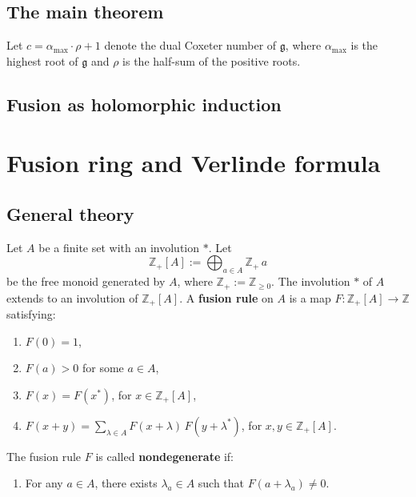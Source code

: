 \documentclass[12pt]{article}
\begin{document}
\subsection{The main theorem}
Let $c = \alpha_{\max} \cdot \rho + 1$ denote the dual Coxeter number of $\mathfrak{g}$, where $\alpha_{\max}$ is the highest root of $\mathfrak{g}$ and $\rho$ is the half-sum of the positive roots. 
\subsection{Fusion as holomorphic induction}

\section{Fusion ring and Verlinde formula}

\subsection{General theory}
\begin{definition}
Let $A$ be a finite set with an involution $*$. Let
\[
\mathbb{Z}_+[A] := \bigoplus_{a\in A} \mathbb{Z}_+\, a
\]
be the free monoid generated by $A$, where $\mathbb{Z}_+ := \mathbb{Z}_{\ge 0}$. The involution $*$ of $A$ extends to an involution of $\mathbb{Z}_+[A]$. A \textbf{fusion rule} on $A$ is a map $F:\mathbb{Z}_+[A]\to \mathbb{Z}$ satisfying:
\begin{enumerate}[(f1)]
\item $F(0)=1$,
\item $F(a)>0$ for some $a\in A$,
\item $F(x)=F(x^*)$, for $x\in \mathbb{Z}_+[A]$,
\item $F(x+y)=\sum_{\lambda\in A} F(x+\lambda)\,F(y+\lambda^*)$, for $x,y\in \mathbb{Z}_+[A]$.
\end{enumerate}
The fusion rule $F$ is called \textbf{nondegenerate} if:
\begin{enumerate}[(f5)]
\item For any $a\in A$, there exists $\lambda_a\in A$ such that $F(a+\lambda_a)\neq 0$.
\end{enumerate}
\end{definition}
\end{document}
